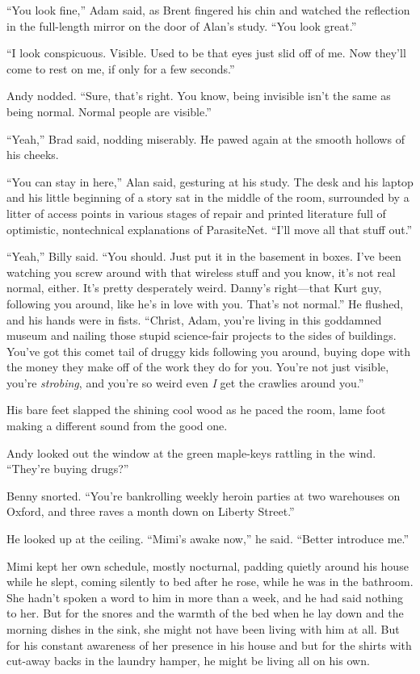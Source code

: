 \documentclass{article}
\begin{document}
``You look fine,'' Adam said, as Brent fingered his chin and watched
the reflection in the full-length mirror on the door of Alan's study. 
``You look great.''

``I look conspicuous.  Visible.  Used to be that eyes just slid off of
me.  Now they'll come to rest on me, if only for a few seconds.''

Andy nodded.  ``Sure, that's right.  You know, being invisible isn't
the same as being normal.  Normal people are visible.''

``Yeah,'' Brad said, nodding miserably.  He pawed again at the smooth
hollows of his cheeks.

``You can stay in here,'' Alan said, gesturing at his study.  The desk
and his laptop and his little beginning of a story sat in the middle
of the room, surrounded by a litter of access points in various stages
of repair and printed literature full of optimistic, nontechnical
explanations of ParasiteNet.  ``I'll move all that stuff out.''

``Yeah,'' Billy said.  ``You should.  Just put it in the basement in
boxes.  I've been watching you screw around with that wireless stuff
and you know, it's not real normal, either.  It's pretty desperately
weird.  Danny's right---that Kurt guy, following you around, like he's
in love with you.  That's not normal.'' He flushed, and his hands were
in fists.  ``Christ, Adam, you're living in this goddamned museum and
nailing those stupid science-fair projects to the sides of buildings. 
You've got this comet tail of druggy kids following you around, buying
dope with the money they make off of the work they do for you.  You're
not just visible, you're \textit{strobing}, and you're so weird even
\textit{I} get the crawlies around you.''

His bare feet slapped the shining cool wood as he paced the room, lame
foot making a different sound from the good one.

Andy looked out the window at the green maple-keys rattling in the
wind.  ``They're buying drugs?''

Benny snorted.  ``You're bankrolling weekly heroin parties at two
warehouses on Oxford, and three raves a month down on Liberty
Street.''

He looked up at the ceiling.  ``Mimi's awake now,'' he said.  ``Better
introduce me.''

Mimi kept her own schedule, mostly nocturnal, padding quietly around
his house while he slept, coming silently to bed after he rose, while
he was in the bathroom.  She hadn't spoken a word to him in more than
a week, and he had said nothing to her.  But for the snores and the
warmth of the bed when he lay down and the morning dishes in the sink,
she might not have been living with him at all.  But for his constant
awareness of her presence in his house and but for the shirts with
cut-away backs in the laundry hamper, he might be living all on his
own.
\end{document}
